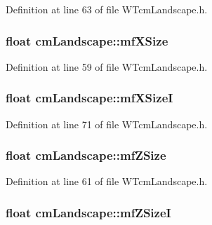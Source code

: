 Definition at line 63 of file WTcmLandscape.h.

\hypertarget{classcm_landscape_ac30d26f95eaf4c8b9d0f0ea1c38d2cc8}{
\subsubsection[{mfXSize}]{\setlength{\rightskip}{0pt plus 5cm}float {\bf cmLandscape::mfXSize}}}
\label{classcm_landscape_ac30d26f95eaf4c8b9d0f0ea1c38d2cc8}


Definition at line 59 of file WTcmLandscape.h.

\hypertarget{classcm_landscape_a3a7a1d57d528ce8fda0f58952fe5f7af}{
\subsubsection[{mfXSizeI}]{\setlength{\rightskip}{0pt plus 5cm}float {\bf cmLandscape::mfXSizeI}}}
\label{classcm_landscape_a3a7a1d57d528ce8fda0f58952fe5f7af}


Definition at line 71 of file WTcmLandscape.h.

\hypertarget{classcm_landscape_ae77a0f253b6815a72438712c42127367}{
\subsubsection[{mfZSize}]{\setlength{\rightskip}{0pt plus 5cm}float {\bf cmLandscape::mfZSize}}}
\label{classcm_landscape_ae77a0f253b6815a72438712c42127367}


Definition at line 61 of file WTcmLandscape.h.

\hypertarget{classcm_landscape_a64b6b9e54f84620e8b8bf3dd083dbbb9}{
\subsubsection[{mfZSizeI}]{\setlength{\rightskip}{0pt plus 5cm}float {\bf cmLandscape::mfZSizeI}}}
\label{classcm_landscape_a64b6b9e54f84620e8b8bf3dd083dbbb9}


